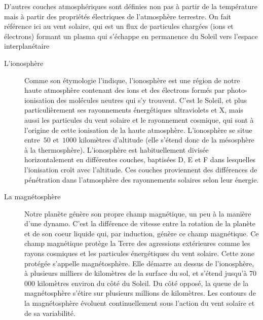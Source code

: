 \sk
D'autres couches atmosphériques sont définies non pas à partir de la température mais à partir des propriétés électriques de l'atmosphère terrestre. On fait référence ici au vent solaire, qui est un flux de particules chargées (ions et électrons) formant un plasma qui s’échappe en permanence du Soleil vers l’espace interplanétaire
\begin{description}
\item[L'ionosphère] Comme son étymologie l'indique, l’ionosphère est une région de notre haute atmosphère contenant des ions et des électrons formés par photo-ionisation des molécules neutres qui s’y trouvent. C’est le Soleil, et plus particulièrement ses rayonnements énergétiques ultraviolets et X, mais aussi les particules du vent solaire et le rayonnement cosmique, qui sont à l’origine de cette ionisation de la haute atmosphère. L’ionosphère se situe entre~$50$ et~$1000$ kilomètres d’altitude (elle s'étend donc de la mésosphère à la thermosphère). L’ionosphère est habituellement divisée horizontalement en différentes couches, baptisées D, E et F dans lesquelles l’ionisation croît avec l’altitude. Ces couches proviennent des différences de pénétration dans l’atmosphère des rayonnements solaires selon leur énergie.
\item[La magnétosphère] Notre planète génère son propre champ magnétique, un peu à la manière d’une dynamo. C’est la différence de vitesse entre la rotation de la planète et de son coeur liquide qui, par induction, génère ce champ magnétique. Ce champ magnétique protège la Terre des agressions extérieures comme les rayons cosmiques et les particules énergétiques du vent solaire. Cette zone protégée s'appelle magnétosphère. Elle démarre au dessus de l’ionosphère, à plusieurs milliers de kilomètres de la surface du sol, et s’étend jusqu’à 70 000 kilomètres environ du côté du Soleil. Du côté opposé, la queue de la magnétosphère s’étire sur plusieurs millions de kilomètres. Les contours de la magnétosphère évoluent continuellement sous l’action du vent solaire et de sa variabilité.
\end{description}
\normalsize

